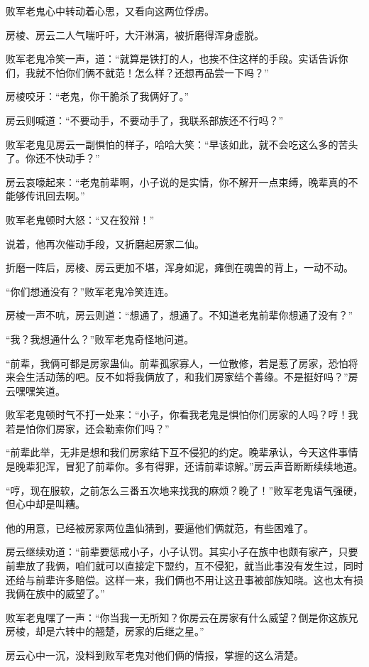 \begin{this_body}
败军老鬼心中转动着心思，又看向这两位俘虏。

房棱、房云二人气喘吁吁，大汗淋漓，被折磨得浑身虚脱。

败军老鬼冷笑一声，道：“就算是铁打的人，也挨不住这样的手段。实话告诉你们，我就不怕你们俩不就范！怎么样？还想再品尝一下吗？”

房棱咬牙：“老鬼，你干脆杀了我俩好了。”

房云则喊道：“不要动手，不要动手了，我联系部族还不行吗？”

败军老鬼见房云一副惧怕的样子，哈哈大笑：“早该如此，就不会吃这么多的苦头了。你还不快动手？”

房云哀嚎起来：“老鬼前辈啊，小子说的是实情，你不解开一点束缚，晚辈真的不能够传讯回去啊。”

败军老鬼顿时大怒：“又在狡辩！”

说着，他再次催动手段，又折磨起房家二仙。

折磨一阵后，房棱、房云更加不堪，浑身如泥，瘫倒在魂兽的背上，一动不动。

“你们想通没有？”败军老鬼冷笑连连。

房棱一声不吭，房云则道：“想通了，想通了。不知道老鬼前辈你想通了没有？”

“我？我想通什么？”败军老鬼奇怪地问道。

“前辈，我俩可都是房家蛊仙。前辈孤家寡人，一位散修，若是惹了房家，恐怕将来会生活动荡的吧。反不如将我俩放了，和我们房家结个善缘。不是挺好吗？”房云嘿嘿笑道。

败军老鬼顿时气不打一处来：“小子，你看我老鬼是惧怕你们房家的人吗？哼！我若是怕你们房家，还会勒索你们吗？”

“前辈此举，无非是想和我们房家结下互不侵犯的约定。晚辈承认，今天这件事情是晚辈犯浑，冒犯了前辈你。多有得罪，还请前辈谅解。”房云声音断断续续地道。

“哼，现在服软，之前怎么三番五次地来找我的麻烦？晚了！”败军老鬼语气强硬，但心中却是叫糟。

他的用意，已经被房家两位蛊仙猜到，要逼他们俩就范，有些困难了。

房云继续劝道：“前辈要惩戒小子，小子认罚。其实小子在族中也颇有家产，只要前辈放了我俩，咱们就可以直接定下盟约，互不侵犯，就当此事没有发生过，同时还给与前辈许多赔偿。这样一来，我们俩也不用让这丑事被部族知晓。这也太有损我俩在族中的威望了。”

败军老鬼嘿了一声：“你当我一无所知？你房云在房家有什么威望？倒是你这族兄房棱，却是六转中的翘楚，房家的后继之星。”

房云心中一沉，没料到败军老鬼对他们俩的情报，掌握的这么清楚。


\end{this_body}
